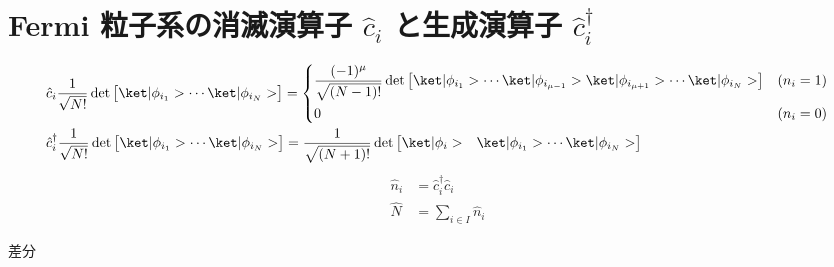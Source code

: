 \documentclass[uplatex,dvipdfmx,a4paper,11pt]{jlreq}
\numberwithin{equation}{section}
\theoremstyle{definition}
\begin{document}
\section{Fermi 粒子系の消滅演算子 $\hat{c}_i$ と生成演算子 $\hat{c}_i^\dagger$}
\begin{definition}
  \begin{align}
     & \hat{c}_i\frac{1}{\sqrt{N!}}\det\begin{bmatrix}\ket|\phi_{i_1}> \cdots \ket|\phi_{i_N}>\end{bmatrix} = \begin{dcases}
                                                                                                                \frac{(-1)^\mu}{\sqrt{(N-1)!}}\det\begin{bmatrix}\ket|\phi_{i_1}> \cdots \ket|\phi_{i_{\mu-1}}>\ket|\phi_{i_{\mu+1}}>\cdots\ket|\phi_{i_N}>\end{bmatrix} & (n_i = 1) \\
                                                                                                                0                                                                                                                                                                                                  & (n_i = 0)
                                                                                                              \end{dcases} \\
     & \hat{c}_i^\dagger\frac{1}{\sqrt{N!}}\det\begin{bmatrix}\ket|\phi_{i_1}> \cdots \ket|\phi_{i_N}>\end{bmatrix} = \frac{1}{\sqrt{(N+1)!}}\det\begin{bmatrix}\ket|\phi_i> & \ket|\phi_{i_1}> \cdots \ket|\phi_{i_N}>\end{bmatrix}
  \end{align}
  \begin{align}
    \hat{n}_i & = \hat{c}_i^\dagger\hat{c}_i \\
    \hat{N}   & = \sum_{i\in I}\hat{n}_i
  \end{align}
\end{definition}
\begin{proposition}
  差分
\end{proposition}
\end{document}
